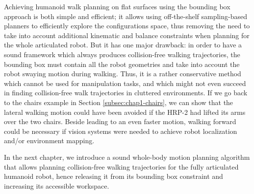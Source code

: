 Achieving humanoid walk planning on flat surfaces using the bounding
box approach is both simple and efficient; it allows using
off-the-shelf sampling-based planners to efficiently explore the
configurations space, thus removing the need to take into account
additional kinematic and balance constraints when planning for the
whole articulated robot. But it has one major drawback: in order to
have a sound framework which always produces collision-free walking
trajectories, the bounding box must contain all the robot geometries
and take into account the robot swaying motion during walking. Thus,
it is a rather conservative method which cannot be used for
manipulation tasks, and which might not even succeed in finding
collision-free walk trajectories in cluttered environments. If we go
back to the chairs example in Section \ref{subsec:chap1-chairs}, we
can show that the lateral walking motion could have been avoided if
the HRP-2 had lifted its arms over the two chairs. Beside leading to
an even faster motion, walking forward could be necessary if vision
systems were needed to achieve robot localization and/or environment
mapping.

In the next chapter, we introduce a sound whole-body motion planning
algorithm that allows planning collision-free walking trajectories for
the fully articulated humanoid robot, hence releasing it from its
bounding box constraint and increasing its accessible workspace.
